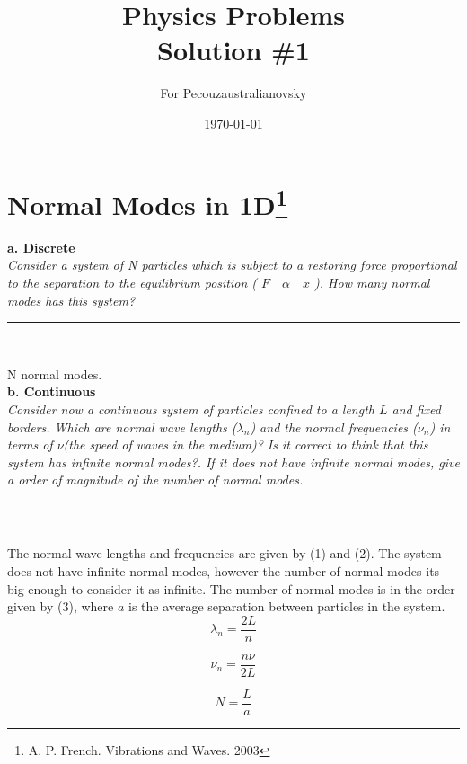 \documentclass{article}
\begin{document}
\title{Physics Problems\\ Solution \#1} %

\author{For Pecouzaustralianovsky} %

\date{\today}
\maketitle

\section*{Normal Modes in 1D\footnote{A. P. French. Vibrations and Waves. 2003}}

\textbf{a. Discrete}\\

\textit{Consider a system of N particles which is subject to a restoring force proportional to the separation to the equilibrium position ( $ F \quad \alpha \quad x $ ). How many normal modes has this system?}

\begin{center}
\noindent\rule{3cm}{0.4pt}\\
\end{center}

\vspace{2mm}

N normal modes.\\


\textbf{b. Continuous }\\

\textit{Consider now a continuous system of particles confined to a length $L$ and fixed borders. Which are normal wave lengths ($\lambda_n$) and the normal frequencies ($\nu_n$) in terms of $\nu$(the speed of waves in the medium)? Is it correct to think that this system has infinite normal modes?. If it does not have infinite normal modes, give a order of magnitude of the number of normal modes.}

\begin{center}
\noindent\rule{3cm}{0.4pt}\\
\end{center}

\vspace{2mm}

The normal wave lengths and frequencies are given by (1) and (2). The system does not have infinite normal modes, however the number of normal modes its big enough to consider it as infinite. The number of normal modes is in the order given by (3), where $a$ is the average separation between particles in the system. \\

\begin{equation}
\lambda_n = \frac{2L}{n}
\end{equation}

\begin{equation}
\nu_n = \frac{n \nu}{2L} 
\end{equation}

\begin{equation}
N = \frac{L}{a}
\end{equation}
\end{document}
